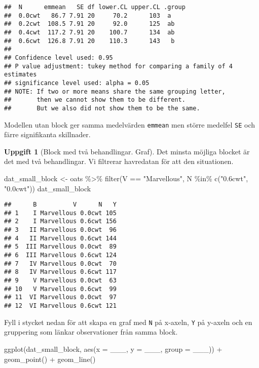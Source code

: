 \documentclass[
]{book}
\newenvironment{Shaded}{\begin{snugshade}}{\end{snugshade}}
\newcommand{\AttributeTok}[1]{\textcolor[rgb]{0.77,0.63,0.00}{#1}}
\newcommand{\FunctionTok}[1]{\textcolor[rgb]{0.00,0.00,0.00}{#1}}
\newcommand{\NormalTok}[1]{#1}
\newcommand{\OtherTok}[1]{\textcolor[rgb]{0.56,0.35,0.01}{#1}}
\newcommand{\SpecialCharTok}[1]{\textcolor[rgb]{0.00,0.00,0.00}{#1}}
\newcommand{\StringTok}[1]{\textcolor[rgb]{0.31,0.60,0.02}{#1}}
\theoremstyle{definition}
\theoremstyle{definition}
\theoremstyle{definition}
\newtheorem{exercise}{Uppgift}[chapter]
\theoremstyle{definition}
\theoremstyle{remark}
\begin{document}
\begin{verbatim}
##  N      emmean   SE df lower.CL upper.CL .group
##  0.0cwt   86.7 7.91 20     70.2      103  a    
##  0.2cwt  108.5 7.91 20     92.0      125  ab   
##  0.4cwt  117.2 7.91 20    100.7      134  ab   
##  0.6cwt  126.8 7.91 20    110.3      143   b   
## 
## Confidence level used: 0.95 
## P value adjustment: tukey method for comparing a family of 4 estimates 
## significance level used: alpha = 0.05 
## NOTE: If two or more means share the same grouping letter,
##       then we cannot show them to be different.
##       But we also did not show them to be the same.
\end{verbatim}

Modellen utan block ger samma medelvärden \texttt{emmean} men större medelfel \texttt{SE} och färre signifikanta skillnader.

\begin{exercise}[Block med två behandlingar. Graf]

Det minsta möjliga blocket är det med två behandlingar. Vi filtrerar havredatan för att den situationen.

\begin{Shaded}
\begin{Highlighting}[]
\NormalTok{dat\_small\_block }\OtherTok{\textless{}{-}}\NormalTok{ oats }\SpecialCharTok{\%\textgreater{}\%} \FunctionTok{filter}\NormalTok{(V }\SpecialCharTok{==} \StringTok{"Marvellous"}\NormalTok{, N }\SpecialCharTok{\%in\%} \FunctionTok{c}\NormalTok{(}\StringTok{"0.6cwt"}\NormalTok{, }\StringTok{"0.0cwt"}\NormalTok{))}
\NormalTok{dat\_small\_block}
\end{Highlighting}
\end{Shaded}

\begin{verbatim}
##      B          V      N   Y
## 1    I Marvellous 0.0cwt 105
## 2    I Marvellous 0.6cwt 156
## 3   II Marvellous 0.0cwt  96
## 4   II Marvellous 0.6cwt 144
## 5  III Marvellous 0.0cwt  89
## 6  III Marvellous 0.6cwt 124
## 7   IV Marvellous 0.0cwt  70
## 8   IV Marvellous 0.6cwt 117
## 9    V Marvellous 0.0cwt  63
## 10   V Marvellous 0.6cwt  99
## 11  VI Marvellous 0.0cwt  97
## 12  VI Marvellous 0.6cwt 121
\end{verbatim}

Fyll i stycket nedan för att skapa en graf med \texttt{N} på x-axeln, \texttt{Y} på y-axeln och en gruppering som länkar observationer från samma block.

\begin{Shaded}
\begin{Highlighting}[]
\FunctionTok{ggplot}\NormalTok{(dat\_small\_block, }\FunctionTok{aes}\NormalTok{(}\AttributeTok{x =}\NormalTok{ \_\_\_, }\AttributeTok{y =}\NormalTok{ \_\_\_, }\AttributeTok{group =}\NormalTok{ \_\_\_)) }\SpecialCharTok{+}
  \FunctionTok{geom\_point}\NormalTok{() }\SpecialCharTok{+}
  \FunctionTok{geom\_line}\NormalTok{()}
\end{Highlighting}
\end{Shaded}

\end{exercise}
\end{document}
